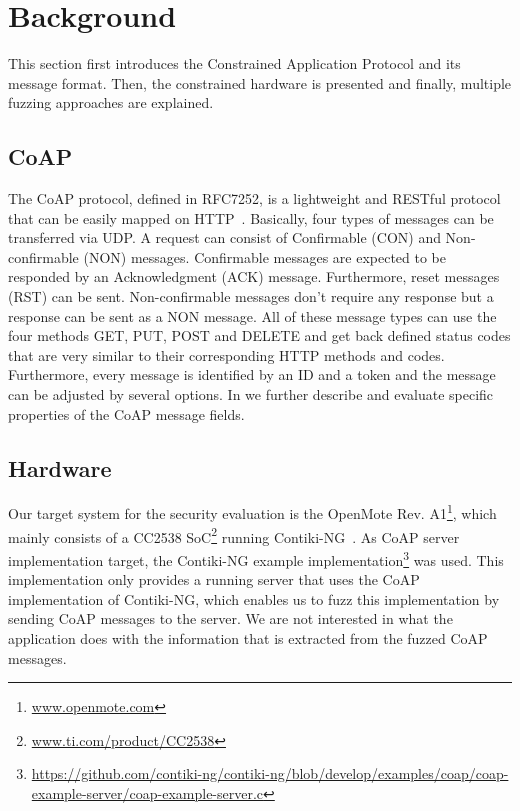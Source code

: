 \section{Background}
\label{section:background}

This section first introduces the Constrained Application Protocol and its message format. Then, the constrained hardware is presented and finally, multiple fuzzing approaches are explained.

\subsection{CoAP}

The CoAP protocol, defined in RFC7252, is a lightweight and RESTful protocol that can be easily mapped on HTTP~\cite{RFC7252}. Basically, four types of messages can be transferred via UDP. A request can consist of Confirmable (CON) and Non-confirmable (NON) messages. Confirmable messages are expected to be responded by an Acknowledgment (ACK) message. Furthermore, reset messages (RST) can be sent. Non-confirmable messages don't require any response but a response can be sent as a NON message. All of these message types can use the four methods GET, PUT, POST and DELETE and get back defined status codes that are very similar to their corresponding HTTP methods and codes. Furthermore, every message is identified by an ID and a token and the message can be adjusted by several options. In  we further describe and evaluate specific properties of the CoAP message fields.

\subsection{Hardware}

Our target system for the security evaluation is the OpenMote Rev. A1\footnote{\url{www.openmote.com}}, which mainly consists of a CC2538 SoC\footnote{\url{www.ti.com/product/CC2538}} running Contiki-NG~\cite{contiki}. As CoAP server implementation target, the Contiki-NG example implementation\footnote{\url{https://github.com/contiki-ng/contiki-ng/blob/develop/examples/coap/coap-example-server/coap-example-server.c}} was used. This implementation only provides a running server that uses the CoAP implementation of Contiki-NG, which enables us to fuzz this implementation by sending CoAP messages to the server. We are not interested in what the application does with the information that is extracted from the fuzzed CoAP messages.

